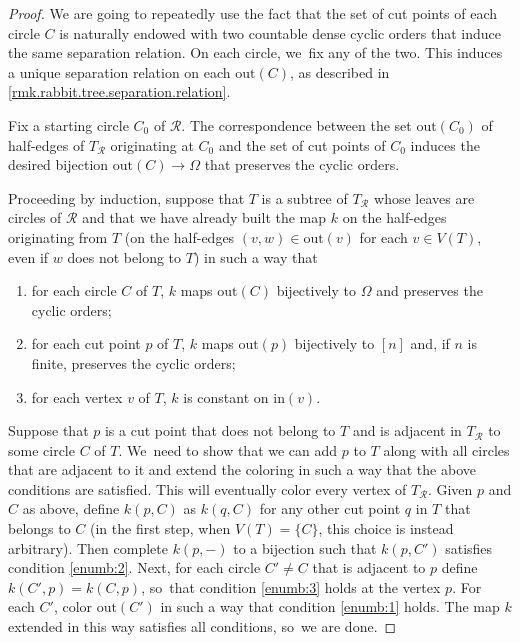 \documentclass[JEP,XML,SOM,Unicode,NoFloatCountersInSection,published]{cedram}
\theoremstyle{plain}
\theoremstyle{definition}
\theoremstyle{remark}
\newcommand{\R}{\mathcal{R}}
\begin{document}
\begin{proof}
We are going to repeatedly use the fact that the set of cut points of each circle $C$ is naturally endowed with two countable dense cyclic orders that induce the same separation relation.
On each circle, we~fix any of the two.
This induces a unique separation relation on each $\mathrm{out}(C)$, as described in \cref{rmk.rabbit.tree.separation.relation}.

Fix a starting circle $C_0$ of $\R$.
The correspondence between the set $\mathrm{out}(C_0)$ of half-edges of $T_\R$ originating at $C_0$ and the set of cut points of $C_0$ induces the desired bijection $\mathrm{out}(C) \to \Omega$ that preserves the cyclic orders.

Proceeding by induction, suppose that $T$ is a subtree of $T_\R$ whose leaves are circles of $\R$ and that we have already built the map $k$ on the half-edges originating from $T$ (\ie on the half-edges $(v,w) \in \mathrm{out}(v)$ for each $v \in V(T)$, even if $w$ does not belong to $T$) in such a way that
\begin{enumerate}
\item\label{enumb:1} for each circle $C$ of $T$, $k$ maps $\mathrm{out}(C)$ bijectively to $\Omega$ and preserves the cyclic orders;
\item\label{enumb:2} for each cut point $p$ of $T$, $k$ maps $\mathrm{out}(p)$ bijectively to $[n]$ and, if $n$ is finite, preserves the cyclic orders;
\item\label{enumb:3} for each vertex $v$ of $T$, $k$ is constant on $\mathrm{in}(v)$.
\end{enumerate}
Suppose that $p$ is a cut point that does not belong to $T$ and is adjacent in $T_\R$ to some circle $C$ of $T$. We~need to show that we can add $p$ to $T$ along with all circles that are adjacent to it and extend the coloring in such a way that the above conditions are satisfied.
This will eventually color every vertex of $T_\R$.
Given $p$ and $C$ as above, define $k(p,C)$ as $k(q,C)$ for any other cut point $q$ in $T$ that belongs to $C$ (in the first step, when $V(T) = \{C\}$, this choice is instead arbitrary).
Then complete $k(p,-)$ to a bijection such that $k(p,C')$ satisfies condition \cref{enumb:2}.
Next, for each circle $C' \neq C$ that is adjacent to $p$ define $k(C',p) = k(C,p)$, so~that condition \cref{enumb:3} holds at the vertex $p$.
For each $C'$, color $\mathrm{out}(C')$ in such a way that condition \cref{enumb:1} holds.
The map $k$ extended in this way satisfies all conditions, so~we are done.
\end{proof}
\end{document}
